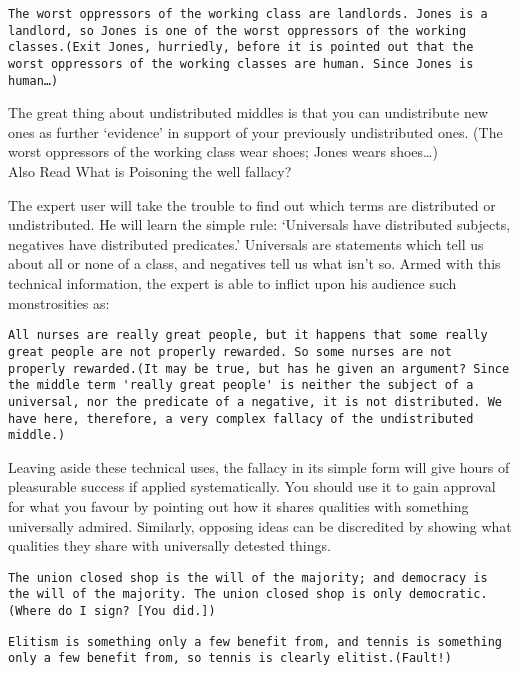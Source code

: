 \documentclass[a4paper,12pt,single,pdftex]{scrartcl}
\begin{document}
    \begin{verbatim}The worst oppressors of the working class are landlords. Jones is a landlord, so Jones is one of the worst oppressors of the working classes.(Exit Jones, hurriedly, before it is pointed out that the worst oppressors of the working classes are human. Since Jones is human…)\end{verbatim}
    
      The great thing about undistributed middles is that you can undistribute new ones as further ‘evidence’ in support of your previously undistributed ones. (The worst oppressors of the working class wear shoes; Jones wears shoes…)
    \\

    
      

      
        Also Read  What is Poisoning the well fallacy?
      
    
    
      The expert user will take the trouble to find out which terms are distributed or undistributed. He will learn the simple rule: ‘Universals have distributed subjects, negatives have distributed predicates.’ Universals are statements which tell us about all or none of a class, and negatives tell us what isn’t so. Armed with this technical information, the expert is able to inflict upon his audience such monstrosities as:
    \\

    \begin{verbatim}All nurses are really great people, but it happens that some really great people are not properly rewarded. So some nurses are not properly rewarded.(It may be true, but has he given an argument? Since the middle term 'really great people' is neither the subject of a universal, nor the predicate of a negative, it is not distributed. We have here, therefore, a very complex fallacy of the undistributed middle.)\end{verbatim}
    
      Leaving aside these technical uses, the fallacy in its simple form will give hours of pleasurable success if applied systematically. You should use it to gain approval for what you favour by pointing out how it shares qualities with something universally admired. Similarly, opposing ideas can be discredited by showing what qualities they share with universally detested things.
    \\

    \begin{verbatim}The union closed shop is the will of the majority; and democracy is the will of the majority. The union closed shop is only democratic.(Where do I sign? [You did.])\end{verbatim}
    \begin{verbatim}Elitism is something only a few benefit from, and tennis is something only a few benefit from, so tennis is clearly elitist.(Fault!)\end{verbatim}
  
\end{document}
